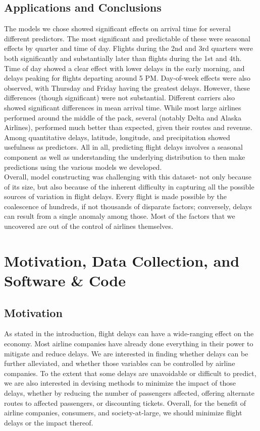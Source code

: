 \documentclass[12pt, a4paper, openany]{book}
\newcommand\tab[1][1cm]{\hspace*{#1}}
\begin{document}
	\section{Applications and Conclusions}

\tab The models we chose showed significant effects on arrival time for several different predictors. The most significant and predictable of these were seasonal effects by quarter and time of day. Flights during the 2nd and 3rd quarters were both significantly and substantially later than flights during the 1st and 4th. Time of day showed a clear effect with lower delays in the early morning, and delays peaking for flights departing around 5 PM. Day-of-week effects were also observed, with Thursday and Friday having the greatest delays. However, these differences (though significant) were not substantial. Different carriers also showed significant differences in mean arrival time. While most large airlines performed around the middle of the pack, several (notably Delta and Alaska Airlines), performed much better than expected, given their routes and revenue. Among quantitative delays, latitude, longitude, and precipitation showed usefulness as predictors. All in all, predicting flight delays involves a seasonal component as well as understanding the underlying distribution to then make predictions using the various models we developed.\\
\tab Overall, model constructing was challenging with this dataset- not only because of its size, but also because of the inherent difficulty in capturing all the possible sources of variation in flight delays. Every flight is made possible by the coalescence of hundreds, if not thousands of disparate factors; conversely, delays can result from a single anomaly among those. Most of the factors that we uncovered are out of the control of airlines themselves. 
\chapter{Motivation, Data Collection, and Software \& Code}

	\section{Motivation}
	\tab As stated in the introduction, flight delays can have a wide-ranging effect on the economy. Most airline companies have already done everything in their power to mitigate and reduce delays. We are interested in finding whether delays can be further alleviated, and whether those variables can be controlled by airline companies. To the extent that some delays are unavoidable or difficult to predict, we are also interested in devising methods to minimize the impact of those delays, whether by reducing the number of passengers affected, offering alternate routes to affected passengers, or discounting tickets. Overall, for the benefit of airline companies, consumers, and society-at-large, we should minimize flight delays or the impact thereof. 
\end{document}
